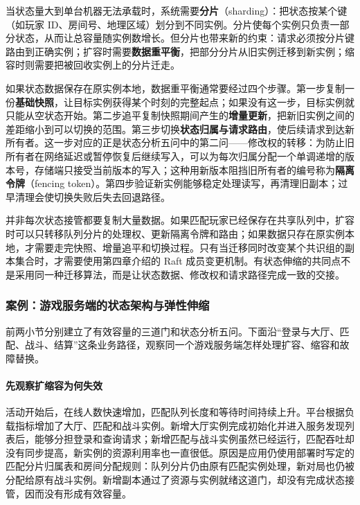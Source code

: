 当状态量大到单台机器无法承载时，系统需要\textbf{分片}（sharding）：把状态按某个键（如玩家 ID、房间号、地理区域）划分到不同实例。分片使每个实例只负责一部分状态，从而让总容量随实例数增长。但分片也带来新的约束：请求必须按分片键路由到正确实例；扩容时需要\textbf{数据重平衡}，把部分分片从旧实例迁移到新实例；缩容时则需要把被回收实例上的分片迁走。

如果状态数据保存在原实例本地，数据重平衡通常要经过四个步骤。第一步复制一份\textbf{基础快照}，让目标实例获得某个时刻的完整起点；如果没有这一步，目标实例就只能从空状态开始。第二步追平复制快照期间产生的\textbf{增量更新}，把新旧实例之间的差距缩小到可以切换的范围。第三步切换\textbf{状态归属与请求路由}，使后续请求到达新所有者。这一步对应的正是状态分析五问中的第二问——修改权的转移：为防止旧所有者在网络延迟或暂停恢复后继续写入，可以为每次归属分配一个单调递增的版本号，存储端只接受当前版本的写入；这种用新版本阻挡旧所有者的编号称为\textbf{隔离令牌}（fencing token）。第四步验证新实例能够稳定处理读写，再清理旧副本；过早清理会使切换失败后失去回退路径。

并非每次状态接管都要复制大量数据。如果匹配玩家已经保存在共享队列中，扩容时可以只转移队列分片的处理权、更新隔离令牌和路由；如果数据只存在原实例本地，才需要走完快照、增量追平和切换过程。只有当迁移同时改变某个共识组的副本集合时，才需要使用第四章介绍的 Raft 成员变更机制。有状态伸缩的共同点不是采用同一种迁移算法，而是让状态数据、修改权和请求路径完成一致的交接。

\subsubsection{案例：游戏服务端的状态架构与弹性伸缩}
\label{sec6:game-state-scaling}

前两小节分别建立了有效容量的三道门和状态分析五问。下面沿“登录与大厅、匹配、战斗、结算”这条业务路径，观察同一个游戏服务端怎样处理扩容、缩容和故障替换。

\paragraph{先观察扩缩容为何失效}

活动开始后，在线人数快速增加，匹配队列长度和等待时间持续上升。平台根据负载指标增加了大厅、匹配和战斗实例。新增大厅实例完成初始化并进入服务发现列表后，能够分担登录和查询请求；新增匹配与战斗实例虽然已经运行，匹配吞吐却没有同步提高，新实例的资源利用率也一直很低。原因是应用仍使用部署时写定的匹配分片归属表和房间分配规则：队列分片仍由原有匹配实例处理，新对局也仍被分配给原有战斗实例。新增副本通过了资源与实例就绪这道门，却没有完成状态接管，因而没有形成有效容量。

